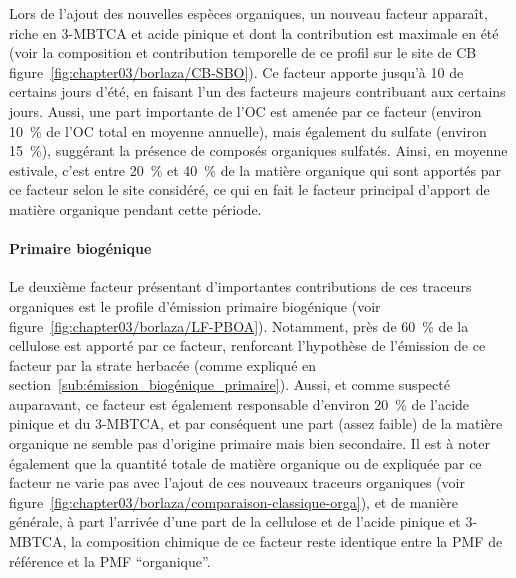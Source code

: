 Lors de l'ajout des nouvelles espèces organiques, un nouveau facteur apparaît, riche en
3-MBTCA et acide pinique et dont la contribution est maximale en été (voir la composition
et contribution temporelle de ce profil sur le site de CB
figure~\ref{fig:chapter03/borlaza/CB-SBO}).  Ce facteur apporte jusqu'à \SI{10}{\ugm} de
\PMdix{} certains jours d'été, en faisant l'un des facteurs majeurs contribuant aux
\PMdix{} certains jours.  Aussi, une part importante de l'OC est amenée par ce facteur
(environ \SI{10}{\percent} de l'OC total en moyenne annuelle), mais également du sulfate (environ
\SI{15}{\percent}), suggérant la présence de composés organiques sulfatés.  Ainsi, en
moyenne estivale, c'est entre \SI{20}{\percent} et \SI{40}{\percent} de la matière
organique qui sont apportés par ce facteur selon le site considéré, ce qui en fait le
facteur principal d'apport de matière organique pendant cette période.

\paragraph{Primaire biogénique}%
\label{par:primaire_biogénique}

Le deuxième facteur présentant d'importantes contributions de ces traceurs organiques est
le profile d'émission primaire biogénique (voir
figure~\ref{fig:chapter03/borlaza/LF-PBOA}). Notamment, près de \SI{60}{\percent} de la
cellulose est apporté par ce facteur, renforcant l'hypothèse de l'émission de ce facteur
par la strate herbacée (comme expliqué en
section~\ref{sub:émission_biogénique_primaire}). Aussi, et comme suspecté auparavant, ce
facteur est également responsable d'environ \SI{20}{\percent} de l'acide pinique et du
3-MBTCA, et par conséquent une part (assez faible) de la matière organique ne semble pas
d'origine primaire mais bien secondaire. Il est à noter également que la quantité totale
de matière organique ou de \PMdix{} expliquée par ce facteur ne varie pas avec l'ajout de
ces nouveaux traceurs organiques (voir
figure~\ref{fig:chapter03/borlaza/comparaison-classique-orga}), et de manière générale, à
part l'arrivée d'une part de la cellulose et de l'acide pinique et 3-MBTCA, la composition chimique de
ce facteur reste identique entre la PMF de référence et la PMF ``organique''.

